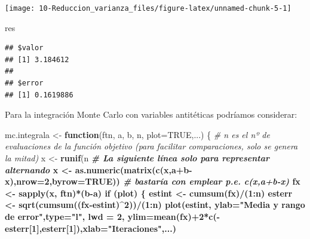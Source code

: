 \documentclass[]{book}
\newenvironment{Shaded}{\begin{snugshade}}{\end{snugshade}}
\newcommand{\KeywordTok}[1]{\textcolor[rgb]{0.13,0.29,0.53}{\textbf{#1}}}
\newcommand{\DataTypeTok}[1]{\textcolor[rgb]{0.13,0.29,0.53}{#1}}
\newcommand{\DecValTok}[1]{\textcolor[rgb]{0.00,0.00,0.81}{#1}}
\newcommand{\StringTok}[1]{\textcolor[rgb]{0.31,0.60,0.02}{#1}}
\newcommand{\CommentTok}[1]{\textcolor[rgb]{0.56,0.35,0.01}{\textit{#1}}}
\newcommand{\OtherTok}[1]{\textcolor[rgb]{0.56,0.35,0.01}{#1}}
\newcommand{\ControlFlowTok}[1]{\textcolor[rgb]{0.13,0.29,0.53}{\textbf{#1}}}
\newcommand{\OperatorTok}[1]{\textcolor[rgb]{0.81,0.36,0.00}{\textbf{#1}}}
\newcommand{\NormalTok}[1]{#1}
\theoremstyle{definition}
\theoremstyle{definition}
\theoremstyle{definition}
\theoremstyle{remark}
\begin{document}
\begin{center}\texttt{[image: 10-Reduccion\_varianza\_files/figure-latex/unnamed-chunk-5-1]} \end{center}

\begin{Shaded}
\begin{Highlighting}[]
\NormalTok{res}
\end{Highlighting}
\end{Shaded}

\begin{verbatim}
## $valor
## [1] 3.184612
## 
## $error
## [1] 0.1619886
\end{verbatim}

Para la integración Monte Carlo con variables antitéticas podríamos
considerar:

\begin{Shaded}
\begin{Highlighting}[]
\NormalTok{mc.integrala <-}\StringTok{ }\ControlFlowTok{function}\NormalTok{(ftn, a, b, n, }\DataTypeTok{plot=}\OtherTok{TRUE}\NormalTok{,...) \{}
  \CommentTok{# n es el nº de evaluaciones de la función objetivo (para facilitar comparaciones, solo se genera la mitad)}
\NormalTok{  x <-}\StringTok{ }\KeywordTok{runif}\NormalTok{(n}\OperatorTok{%
  \CommentTok{# La siguiente línea solo para representar alternando}
\NormalTok{  x <-}\StringTok{ }\KeywordTok{as.numeric}\NormalTok{(}\KeywordTok{matrix}\NormalTok{(}\KeywordTok{c}\NormalTok{(x,a}\OperatorTok{+}\NormalTok{b}\OperatorTok{-}\NormalTok{x),}\DataTypeTok{nrow=}\DecValTok{2}\NormalTok{,}\DataTypeTok{byrow=}\OtherTok{TRUE}\NormalTok{))}
  \CommentTok{# bastaría con emplear p.e. c(x,a+b-x)}
\NormalTok{  fx <-}\StringTok{ }\KeywordTok{sapply}\NormalTok{(x, ftn)}\OperatorTok{*}\NormalTok{(b}\OperatorTok{-}\NormalTok{a)}
  \ControlFlowTok{if}\NormalTok{ (plot) \{}
\NormalTok{    estint <-}\StringTok{ }\KeywordTok{cumsum}\NormalTok{(fx)}\OperatorTok{/}\NormalTok{(}\DecValTok{1}\OperatorTok{:}\NormalTok{n)}
\NormalTok{    esterr <-}\StringTok{ }\KeywordTok{sqrt}\NormalTok{(}\KeywordTok{cumsum}\NormalTok{((fx}\OperatorTok{-}\NormalTok{estint)}\OperatorTok{^}\DecValTok{2}\NormalTok{))}\OperatorTok{/}\NormalTok{(}\DecValTok{1}\OperatorTok{:}\NormalTok{n)}
    \KeywordTok{plot}\NormalTok{(estint, }\DataTypeTok{ylab=}\StringTok{"Media y rango de error"}\NormalTok{,}\DataTypeTok{type=}\StringTok{"l"}\NormalTok{, }\DataTypeTok{lwd =} \DecValTok{2}\NormalTok{,}
         \DataTypeTok{ylim=}\KeywordTok{mean}\NormalTok{(fx)}\OperatorTok{+}\DecValTok{2}\OperatorTok{*}\KeywordTok{c}\NormalTok{(}\OperatorTok{-}\NormalTok{esterr[}\DecValTok{1}\NormalTok{],esterr[}\DecValTok{1}\NormalTok{]),}\DataTypeTok{xlab=}\StringTok{"Iteraciones"}\NormalTok{,...)}
}
\end{Highlighting}
\end{Shaded}
\end{document}
